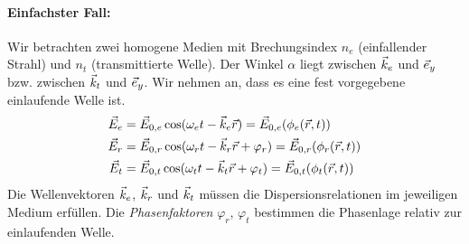 \paragraph{Einfachster Fall:} Wir betrachten zwei homogene Medien mit
Brechungsindex $n_e$ (einfallender Strahl) und $n_t$ (transmittierte
Welle).
% 
% 
Der Winkel $\alpha$ liegt zwischen $\vec{k}_e$ und $\vec{e}_y$
bzw. zwischen $\vec{k}_t$ und $\vec{e}_y$. Wir nehmen an, dass es eine
fest vorgegebene einlaufende Welle ist.
\begin{align*}
  \vec{E}_e &= \vec{E}_{0,e}\cos(\omega_et-\vec{k}_e\vec{r})
            =\vec{E}_{0,e}(\phi_e(\vec{r},t))\\
  \vec{E}_r &= \vec{E}_{0,r}\cos(\omega_rt - \vec{k}_r\vec{r}+\varphi_r)
            =\vec{E}_{0,r}(\phi_r(\vec{r},t))\\
  \vec{E}_t &= \vec{E}_{0,t}\cos(\omega_tt - \vec{k}_t\vec{r} + \varphi_t)
            =\vec{E}_{0,t}(\phi_t(\vec{r},t))
\end{align*}
Die Wellenvektoren $\vec{k}_e$, $\vec{k}_r$ und $\vec{k}_t$ müssen die%
%
%
Dispersionsrelationen im jeweiligen Medium erfüllen. Die
\emph{Phasenfaktoren}
$\varphi_r$, $\varphi_t$%
%
bestimmen die Phasenlage relativ zur einlaufenden Welle.


